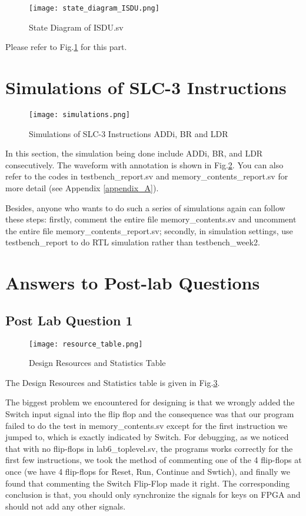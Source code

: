 \documentclass[11pt]{article}
\begin{document}
\begin{figure}[h]
    \centering
    \texttt{[image: state\_diagram\_ISDU.png]}
    \caption{State Diagram of ISDU.sv}
    \label{state_diagram}
\end{figure}

Please refer to Fig.\ref{state_diagram} for this part.

\section{Simulations of SLC-3 Instructions}


\begin{figure}[h]
    \centering
    \texttt{[image: simulations.png]}
    \caption{Simulations of SLC-3 Instructions ADDi, BR and LDR}
    \label{simulations}
\end{figure}

In this section, the simulation being done include ADDi, BR, and LDR consecutively. The waveform with annotation is shown in Fig.\ref{simulations}. You can also refer to the codes in testbench\_report.sv and memory\_contents\_report.sv for more detail (see Appendix \ref{appendix_A}).

Besides, anyone who wants to do such a series of simulations again can follow these steps: firstly, comment the entire file memory\_contents.sv and uncomment the entire file memory\_contents\_report.sv; secondly, in simulation settings, use testbench\_report to do RTL simulation rather than testbench\_week2.



\section{Answers to Post-lab Questions}
\subsection{Post Lab Question 1}

\begin{figure}[h]
    \centering
    \texttt{[image: resource\_table.png]}
    \caption{Design Resources and Statistics Table}
    \label{resources}
\end{figure}

The Design Resources and Statistics table is given in Fig.\ref{resources}.

The biggest problem we encountered for designing is that we wrongly added the Switch input signal into the flip flop and the consequence was that our program failed to do the test in memory\_contents.sv except for the first instruction we jumped to, which is exactly indicated by Switch. For debugging, as we noticed that with no flip-flops in lab6\_toplevel.sv, the programs works correctly for the first few instructions, we took the method of commenting one of the 4 flip-flops at once (we have 4 flip-flops for Reset, Run, Continue and Swtich), and finally we found that commenting the Switch Flip-Flop made it right. The corresponding conclusion is that, you should only synchronize the signals for keys on FPGA and should not add any other signals.
\end{document}

